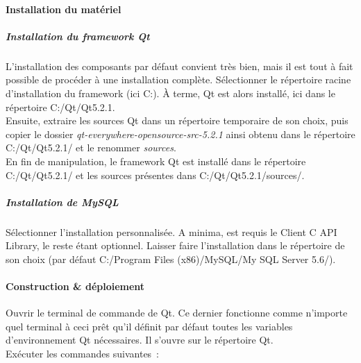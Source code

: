 \paragraph{Installation du matériel}

\subparagraph{Installation du framework Qt}
L'installation des composants par défaut convient très bien, mais il est tout à fait possible de procéder à une installation complète. Sélectionner le répertoire racine d'installation du framework (ici C:). À terme, Qt est alors installé, ici dans le répertoire C:/Qt/Qt5.2.1.
\\
Ensuite, extraire les sources Qt dans un répertoire temporaire de son choix, puis copier le dossier \textit{qt-everywhere-opensource-src-5.2.1} ainsi obtenu dans le répertoire C:/Qt/Qt5.2.1/ et le renommer \textit{sources}.
\\
En fin de manipulation, le framework Qt est installé dans le répertoire C:/Qt/Qt5.2.1/ et les sources présentes dans C:/Qt/Qt5.2.1/sources/.

\subparagraph{Installation de MySQL}
Sélectionner l'installation personnalisée.
A minima, est requis le {\quote Client C API Library}, le reste étant optionnel.
Laisser faire l'installation dans le répertoire de son choix (par défaut C:/Program Files (x86)/MySQL/My SQL Server 5.6/).

\paragraph{Construction \& déploiement}
Ouvrir le terminal de commande de Qt.
Ce dernier fonctionne comme n'importe quel terminal à ceci prêt qu'il définit par défaut toutes les variables d'environnement Qt nécessaires.
Il s'ouvre sur le répertoire Qt.
\\
Exécuter les commandes suivantes~:


